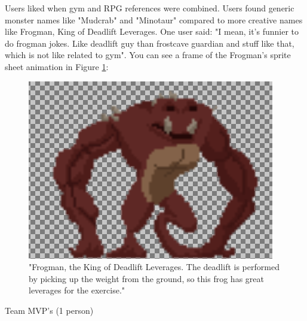 \documentclass{l4proj}
\begin{document}
Users liked when gym and RPG references were combined. Users found generic monster names like "Mudcrab" and "Minotaur" compared to more creative names like Frogman, King of Deadlift Leverages. One user said: "I mean, it's funnier to do frogman jokes. Like deadlift guy than frostcave guardian and stuff like that, which is not like related to gym". You can see a frame of the Frogman's sprite sheet animation in Figure \ref{fig:frogman}:

\begin{figure}[H]
    \centering
    \includegraphics[width=1.0\linewidth]{froggie.png}    
    \caption{
      "Frogman, the King of Deadlift Leverages. The deadlift is performed by picking up the weight from the ground, so this frog has great leverages for the exercise."
    }
    \label{fig:frogman} 
\end{figure}


Team MVP's (1 person)
  




%



%
%
%  
%
%
%
\end{document}
